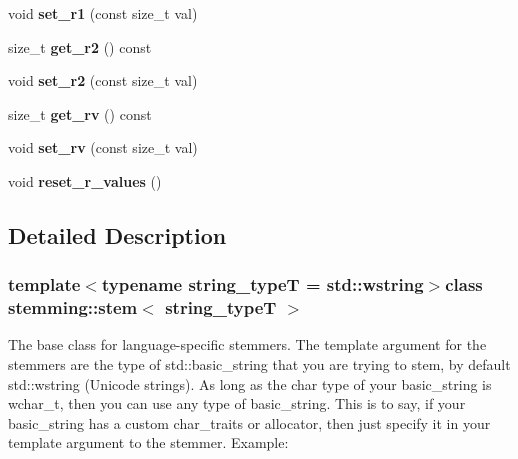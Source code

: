 \begin{DoxyCompactItemize}
\item 
\hypertarget{group___stemming_ga87fa173343063b5e85722edefe493ab5}{void {\bfseries set\-\_\-r1} (const size\-\_\-t val)}\label{group___stemming_ga87fa173343063b5e85722edefe493ab5}

\item 
\hypertarget{group___stemming_ga90aba2c99e1fa12883eba32211089f3b}{size\-\_\-t {\bfseries get\-\_\-r2} () const }\label{group___stemming_ga90aba2c99e1fa12883eba32211089f3b}

\item 
\hypertarget{group___stemming_ga032bb774988c5b8f6fae7cf28b59d485}{void {\bfseries set\-\_\-r2} (const size\-\_\-t val)}\label{group___stemming_ga032bb774988c5b8f6fae7cf28b59d485}

\item 
\hypertarget{group___stemming_gaefa75f006e0b4b623a2608dc23dff605}{size\-\_\-t {\bfseries get\-\_\-rv} () const }\label{group___stemming_gaefa75f006e0b4b623a2608dc23dff605}

\item 
\hypertarget{group___stemming_ga1fda692e873dfcae7048679ffdb29a5e}{void {\bfseries set\-\_\-rv} (const size\-\_\-t val)}\label{group___stemming_ga1fda692e873dfcae7048679ffdb29a5e}

\item 
\hypertarget{group___stemming_gacefba08458c6a8cc00a733afb3a064ed}{void {\bfseries reset\-\_\-r\-\_\-values} ()}\label{group___stemming_gacefba08458c6a8cc00a733afb3a064ed}

\end{DoxyCompactItemize}


\subsection{Detailed Description}
\subsubsection*{template$<$typename string\-\_\-type\-T = std\-::wstring$>$class stemming\-::stem$<$ string\-\_\-type\-T $>$}

The base class for language-\/specific stemmers. The template argument for the stemmers are the type of std\-::basic\-\_\-string that you are trying to stem, by default std\-::wstring (Unicode strings). As long as the char type of your basic\-\_\-string is wchar\-\_\-t, then you can use any type of basic\-\_\-string. This is to say, if your basic\-\_\-string has a custom char\-\_\-traits or allocator, then just specify it in your template argument to the stemmer. Example\-: 



